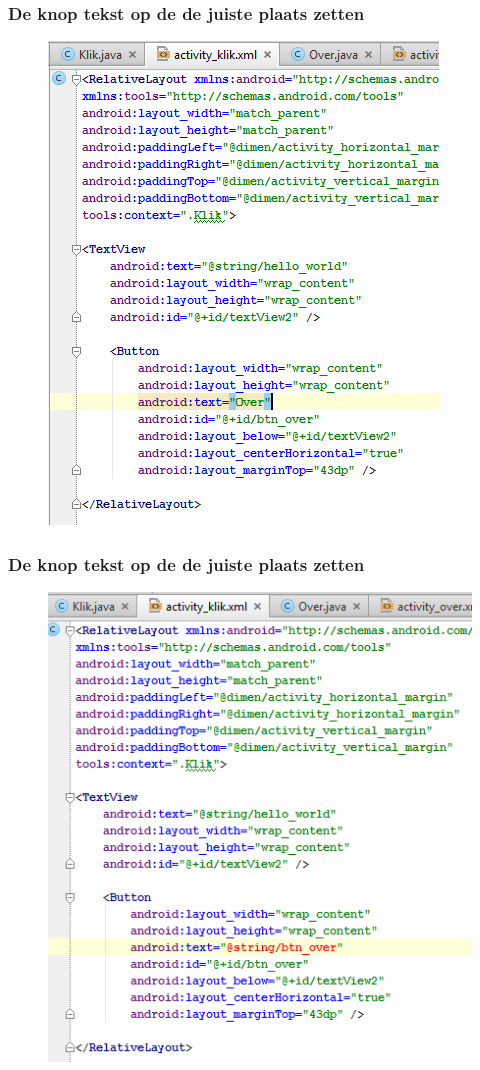 \documentclass[11pt]{beamer}
\begin{document}
\begin{frame}
\frametitle{De knop tekst op de de juiste plaats zetten}
\begin{figure}
\centering
\includegraphics[height=.9\textheight]{./addbutton4}
\label{fig:addbutton4}
\end{figure}
\end{frame}

\begin{frame}
\frametitle{De knop tekst op de de juiste plaats zetten}
\begin{figure}
\centering
\includegraphics[height=.9\textheight]{./addbutton5}
\label{fig:addbutton5}
\end{figure}
\end{frame}
\end{document}
